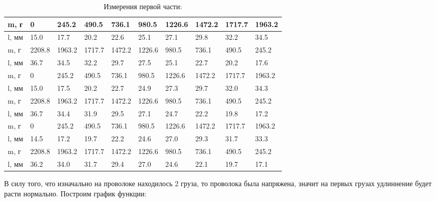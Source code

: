 \documentclass[a4paper,12pt]{article}
\begin{document}
	\begin{table}
		\caption{Измерения первой части:}
		\begin{center}
			\begin{tabular}{|l|l|l|l|l|l|l|l|l|l|}
				\hline 
				m, г & 0 & 245.2 & 490.5 & 736.1 & 980.5 & 1226.6 & 1472.2 & 1717.7 & 1963.2  \\ 
				\hline
				l, мм & 15.0 & 17.7 & 20.2 & 22.6 & 25.1 & 27.1 & 29.8 & 32.2 & 34.5    \\ 
				\hline
				m, г & 2208.8 & 1963.2 & 1717.7 & 1472.2 & 1226.6 & 980.5 & 736.1 & 490.5 & 245.2 \\
				\hline
				
				l, мм & 36.7 & 34.5 & 32.2 & 29.7 & 27.5 & 25.1 & 22.7 & 20.2 & 17.6 \\
				\hline
				
				m, г & 0 & 245.2 & 490.5 & 736.1 & 980.5 & 1226.6 & 1472.2 & 1717.7 & 1963.2  \\ 
				\hline
				
				l, мм & 15.0 & 17.5 & 20.2 & 22.7 & 24.9 & 27.3 & 29.7 & 32.0 & 34.3 \\
				\hline
				
				m, г & 2208.8 & 1963.2 & 1717.7 & 1472.2 & 1226.6 & 980.5 & 736.1 & 490.5 & 245.2 \\
				\hline
				
				l, мм & 36.7 & 34.4 & 31.9 & 29.5 & 27.1 & 24.7 & 22.2 & 19.8 & 17.2 \\
				\hline
				
				m, г & 0 & 245.2 & 490.5 & 736.1 & 980.5 & 1226.6 & 1472.2 & 1717.7 & 1963.2  \\ 
				\hline
				
				l, мм & 14.5 & 17.2 & 19.7 & 22.2 & 24.6 & 27.0 & 29.3 & 31.7 & 33.3 \\
				\hline
				
				m, г & 2208.8 & 1963.2 & 1717.7 & 1472.2 & 1226.6 & 980.5 & 736.1 & 490.5 & 245.2 \\
				\hline
				
				l, мм & 36.2 & 34.0 & 31.7 & 29.4 & 27.0 & 24.6 & 22.1 & 19.7 & 17.1 \\
				\hline
				
			\end{tabular}
		\end{center}
	\end{table}
	В силу того, что изначально на проволоке находилось 2 груза, то проволока была напряжена, значит на первых грузах удлиннение будет расти нормально. Построим график функции:
	
\end{document}
